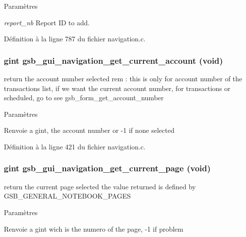 \begin{DoxyParams}{Paramètres}
\item[{\em report\_\-nb}]Report ID to add. \end{DoxyParams}


Définition à la ligne 787 du fichier navigation.c.

\subsubsection[{gsb\_\-gui\_\-navigation\_\-get\_\-current\_\-account}]{\setlength{\rightskip}{0pt plus 5cm}gint gsb\_\-gui\_\-navigation\_\-get\_\-current\_\-account (void)}\label{navigation_8h_a3b668bf52ce71dcff3ea10c9db7be859}
return the account number selected rem : this is only for account number of the transactions list, if we want the current account number, for transactions or scheduled, go to see gsb\_\-form\_\-get\_\-account\_\-number


\begin{DoxyParams}{Paramètres}
\item[{\em }]\end{DoxyParams}
\begin{DoxyReturn}{Renvoie}
a gint, the account number or -\/1 if none selected 
\end{DoxyReturn}


Définition à la ligne 421 du fichier navigation.c.

\subsubsection[{gsb\_\-gui\_\-navigation\_\-get\_\-current\_\-page}]{\setlength{\rightskip}{0pt plus 5cm}gint gsb\_\-gui\_\-navigation\_\-get\_\-current\_\-page (void)}\label{navigation_8h_a06fa2882a164439e56e780c2127cd22c}
return the current page selected the value returned is defined by GSB\_\-GENERAL\_\-NOTEBOOK\_\-PAGES


\begin{DoxyParams}{Paramètres}
\item[{\em }]\end{DoxyParams}
\begin{DoxyReturn}{Renvoie}
a gint wich is the numero of the page, -\/1 if problem 
\end{DoxyReturn}


